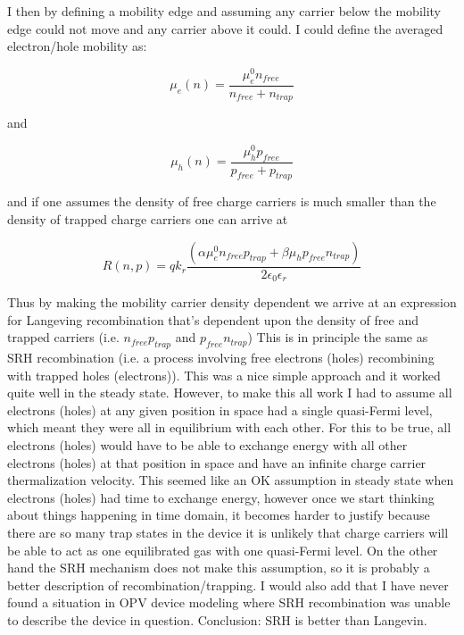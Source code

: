 I then by defining a mobility edge and assuming any carrier below the mobility edge could not move and any carrier above it could.  I could define the averaged electron/hole mobility as: 

\begin{equation}
\mu_e(n)=\frac{\mu_e^0 n_{free}}{n_{free}+n_{trap}}
\end{equation}

and

\begin{equation}
\mu_h(n)=\frac{\mu_h^0 p_{free}}{p_{free}+p_{trap}}
\end{equation}

and if one assumes the density of free charge carriers is much smaller than the density of trapped charge carriers one can arrive at

\begin{equation}
R(n,p)=q k_{r}\frac{(\alpha \mu_e^0 n_{free} p_{trap}+\beta \mu_h p_{free} n_{trap}) }{2\epsilon_0\epsilon_r}
\end{equation}

Thus by making the mobility carrier density dependent we arrive at an expression for Langeving recombination that's dependent upon the density of free and trapped carriers (i.e. $n_{free} p_{trap}$ and $ p_{free} n_{trap}$) This is in principle the same as SRH recombination (i.e. a process involving free electrons (holes) recombining with trapped holes (electrons)).  This was a nice simple approach and it worked quite well in the steady state.  However, to make this all work I had to assume all electrons (holes) at any given position in space had a single quasi-Fermi level, which meant they were all in equilibrium with each other.  For this to be true, all electrons (holes) would have to be able to exchange energy with all other electrons (holes) at that position in space and have an infinite charge carrier thermalization velocity.  This seemed like an OK assumption in steady state when electrons (holes) had time to exchange energy, however once we start thinking about things happening in time domain, it becomes harder to justify because there are so many trap states in the device it is unlikely that charge carriers will be able to act as one equilibrated gas with one quasi-Fermi level.  On the other hand the SRH mechanism does not make this assumption, so it is probably a better description of recombination/trapping.  I would also add that I have never found a situation in OPV device modeling where SRH recombination was unable to describe the device in question.  Conclusion: SRH is better than Langevin.  


